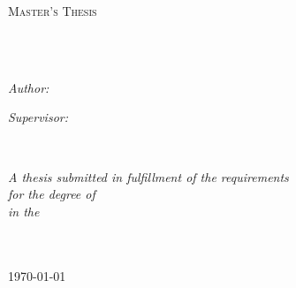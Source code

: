 \documentclass[
11pt, %
english, %
singlespacing, %
headsepline, %
]{MastersDoctoralThesis} %
\author{Axel \textsc{Ind}} %
\begin{document}
\frontmatter %

\pagestyle{plain} %


\begin{titlepage}
\begin{center}

\vspace*{.06\textheight}
{\scshape\LARGE \univname\par}\vspace{1.5cm} %
\textsc{\Large Master's Thesis}\\[0.5cm] %

\HRule \\[0.4cm] %
{\huge \bfseries \ttitle\par}\vspace{0.4cm} %
\HRule \\[1.5cm] %
 
\begin{minipage}[t]{0.4\textwidth}
\begin{flushleft} \large
\emph{Author:}\\
\href{http://www.johnsmith.com}{\authorname} %
\end{flushleft}
\end{minipage}
\begin{minipage}[t]{0.4\textwidth}
\begin{flushright} \large
\emph{Supervisor:} \\
\href{http://www.jamessmith.com}{\supname} %
\end{flushright}
\end{minipage}\\[3cm]
 
\vfill

\large \textit{A thesis submitted in fulfillment of the requirements\\ for the degree of \degreename}\\[0.3cm] %
\textit{in the}\\[0.4cm]
\groupname\\\deptname\\[2cm] %
 
\vfill

{\large \today}\\[4cm] %
 
\vfill
\end{center}
\end{titlepage}
\end{document}
